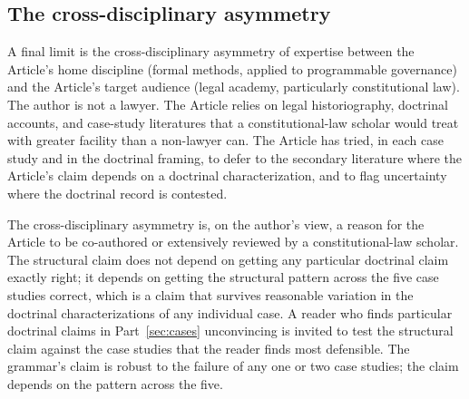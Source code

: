 \subsection{The cross-disciplinary asymmetry}

A final limit is the cross-disciplinary asymmetry of expertise between the Article's home discipline (formal methods,
applied to programmable governance) and the Article's target audience (legal academy, particularly constitutional law).
The author is not a lawyer.
The Article relies on legal historiography, doctrinal accounts, and case-study literatures that a constitutional-law
scholar would treat with greater facility than a non-lawyer can.
The Article has tried, in each case study and in the doctrinal framing, to defer to the secondary literature where
the Article's claim depends on a doctrinal characterization,
and to flag uncertainty where the doctrinal record is contested.

The cross-disciplinary asymmetry is, on the author's view, a reason for the Article to be co-authored or extensively
reviewed by a constitutional-law scholar.
The structural claim does not depend on getting any particular doctrinal claim exactly right;
it depends on getting the structural pattern across the five case studies correct,
which is a claim that survives reasonable variation in the doctrinal characterizations of any individual case.
A reader who finds particular doctrinal claims in Part~\ref{sec:cases} unconvincing is invited to test the structural
claim against the case studies that the reader finds most defensible.
The grammar's claim is robust to the failure of any one or two case studies;
the claim depends on the pattern across the five.
